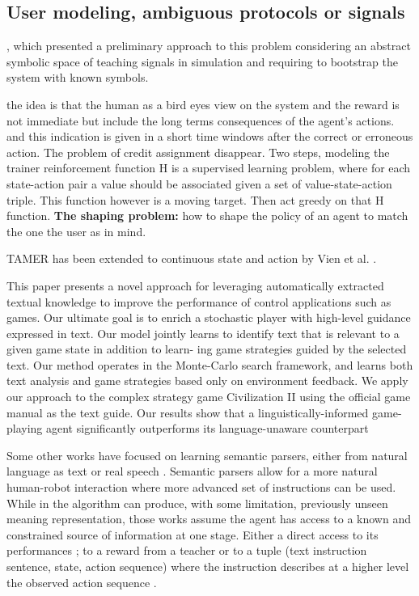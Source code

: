 \subsection{User modeling, ambiguous protocols or signals}

\cite{macl11simul}, which presented a preliminary approach to this problem considering an abstract symbolic space of teaching signals in simulation and requiring to bootstrap the system with known symbols.

\cite{knox2009interactively} the idea is that the human as a bird eyes view on the system and the reward is not immediate but include the long terms consequences of the agent's actions. and this indication is given in a short time windows after the correct or erroneous action. The problem of credit assignment disappear.
Two steps, modeling the trainer reinforcement function H is a supervised learning problem, where for each state-action pair a value should be associated given a set of value-state-action triple. This function however is a moving target. Then act greedy on that H function.
\textbf{The shaping problem:} how to shape the policy of an agent to match the one the user as in mind. 

TAMER has been extended to continuous state and action by Vien et al. \cite{vien2013learning}.

\cite{branavan2011learning} This paper presents a novel approach for leveraging automatically extracted textual knowledge to improve the performance of control applications such as games. Our ultimate goal is to enrich a stochastic player with high-level guidance expressed in text. Our model jointly learns to identify text that is relevant to a given game state in addition to learn- ing game strategies guided by the selected text. Our method operates in the Monte-Carlo search framework, and learns both text analysis and game strategies based only on environment feedback. We apply our approach to the complex strategy game Civilization II using the official game manual as the text guide. Our results show that a linguistically-informed game-playing agent significantly outperforms its language-unaware counterpart

Some other works have focused on learning semantic parsers, either from natural language as text \cite{branavan2011learning,kim2012unsupervised} or real speech \cite{doshi2008spoken}. Semantic parsers allow for a more natural human-robot interaction where more advanced set of instructions can be used. While in \cite{kim2012unsupervised} the algorithm can produce, with some limitation, previously unseen meaning representation, those works assume the agent has access to a known and constrained source of information at one stage. Either a direct access to its performances \cite{branavan2011learning}; to a reward from a teacher \cite{doshi2008spoken} or to a tuple (text instruction sentence, state, action sequence) where the instruction describes at a higher level the observed action sequence \cite{kim2012unsupervised}.

